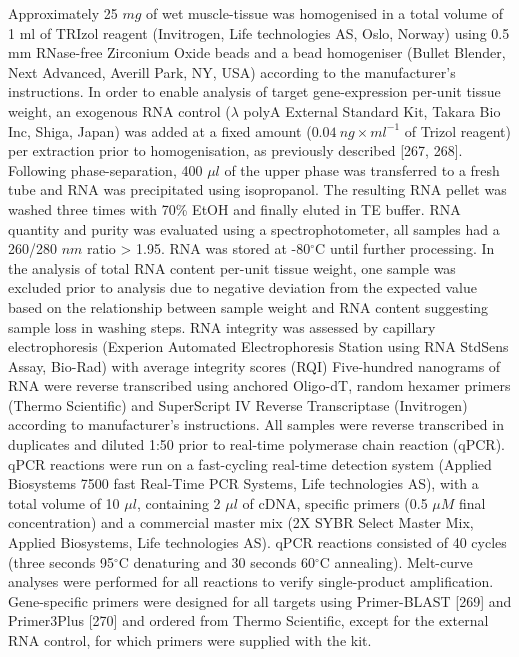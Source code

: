 \documentclass[twoside,10pt]{gihclass} %
\begin{document}
Approximately 25 \(mg\) of wet muscle-tissue was homogenised in a total volume of 1 ml of TRIzol reagent (Invitrogen, Life technologies AS, Oslo, Norway) using 0.5 mm RNase-free Zirconium Oxide beads and a bead homogeniser (Bullet Blender, Next Advanced, Averill Park, NY, USA) according to the manufacturer's instructions.
In order to enable analysis of target gene-expression per-unit tissue weight, an exogenous RNA control (\(\lambda\) polyA External Standard Kit, Takara Bio Inc, Shiga, Japan) was added at a fixed amount (\(0.04 ~ng \times ml^{-1}\) of Trizol reagent) per extraction prior to homogenisation, as previously described
{[}267, 268{]}.
Following phase-separation, 400 \(\mu l\) of the upper phase was transferred to a fresh tube and RNA was precipitated using isopropanol.
The resulting RNA pellet was washed three times with 70\% EtOH and finally eluted in TE buffer.
RNA quantity and purity was evaluated using a spectrophotometer, all samples had a 260/280 \(nm\) ratio \textgreater{} 1.95. RNA was stored at -80\(^{\circ}\)C until further processing. In the analysis of total RNA content per-unit tissue weight, one sample was excluded prior to analysis due to negative deviation from the expected value based on the relationship between sample weight and RNA content suggesting sample loss in washing steps.
RNA integrity was assessed by capillary electrophoresis (Experion Automated Electrophoresis Station using RNA StdSens Assay, Bio-Rad) with average integrity scores (RQI)
Five-hundred nanograms of RNA were reverse transcribed using anchored Oligo-dT, random hexamer primers (Thermo Scientific) and SuperScript IV Reverse Transcriptase (Invitrogen) according to manufacturer's instructions.
All samples were reverse transcribed in duplicates and diluted 1:50 prior to real-time polymerase chain reaction (qPCR).
qPCR reactions were run on a fast-cycling real-time detection system (Applied Biosystems 7500 fast Real-Time PCR Systems, Life technologies AS), with a total volume of 10 \(\mu l\), containing 2 \(\mu l\) of cDNA, specific primers (0.5 \(\mu M\) final concentration) and a commercial master mix (2X SYBR Select Master Mix, Applied Biosystems, Life technologies AS). qPCR reactions consisted of 40 cycles (three seconds 95\(^{\circ}\)C denaturing and 30 seconds 60\(^{\circ}\)C annealing).
Melt-curve analyses were performed for all reactions to verify single-product amplification. Gene-specific primers were designed for all targets using Primer-BLAST {[}269{]} and Primer3Plus {[}270{]} and ordered from Thermo Scientific, except for the external RNA control, for which primers were supplied with the kit.
\end{document}
